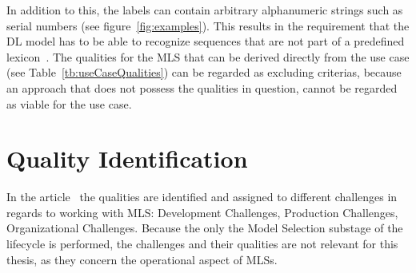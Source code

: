 In addition to this, the labels can contain arbitrary alphanumeric strings such as serial numbers
(see figure~\ref{fig:examples}).
This results in the requirement that the \ac{DL} model has to be able to recognize sequences that
are not part of a predefined lexicon~\citep{ghosh_visual_2017}.
The qualities for the \ac{MLS} that can be derived directly from the use case (see
Table~\ref{tb:useCaseQualities}) can be regarded as excluding criterias, because an approach
that does not possess the qualities in question, cannot be regarded as viable for the use case.

\section{Quality Identification}
In the article~\cite{ashmore_assuring_2021} the qualities are identified and assigned to different
challenges in regards to working with \ac{MLS}: Development Challenges, Production Challenges,
Organizational Challenges.
Because the only the Model Selection substage of the lifecycle is performed, the challenges and their
qualities are not relevant for this thesis, as they concern the operational aspect of \acp{MLS}.



